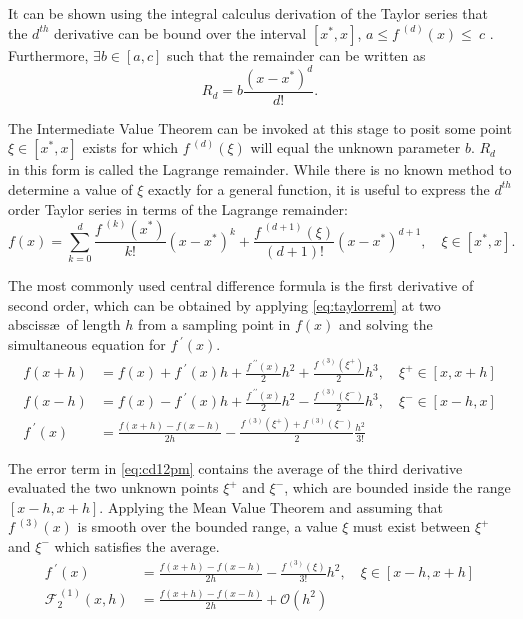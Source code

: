 It can be shown using the integral calculus derivation of the Taylor series that the $d^{th}$ derivative can be bound over the interval $[x^*, x]$, \ie $a\leq f^{\;(d)}(x) \leq~c$ \cite{Greenberg1978}.
Furthermore, $\exists b \in [a,c]$ such that the remainder can be written as
\begin{equation}
   R_d = b \frac{(x-x^*)^d}{d!}.
\end{equation}

The Intermediate Value Theorem can be invoked at this stage to posit some point $\xi \in [x^*,x]$ exists for which $f^{\;(d)}(\xi)$ will equal the unknown parameter $b$.
$R_d$ in this form is called the Lagrange remainder.
While there is no known method to determine a value of $\xi$ exactly for a general function, it is useful to express the $d^{th}$ order Taylor series in terms of the Lagrange remainder:
\begin{equation}
    f(x) = \sum_{k=0}^d \frac{f^{\;(k)}(x^*)}{k!}(x-x^*)^k + \frac{f^{\;(d+1)}(\xi)}{(d+1)!}(x-x^*)^{d+1}, \quad \xi \in [x^*,x].\label{eq:taylorrem}
\end{equation}

The most commonly used central difference formula is the first derivative of second order, which can be obtained by applying \cref{eq:taylorrem} at two absciss\ae\ of length $h$ from a sampling point in $f(x)$ and solving the simultaneous equation for $f^{\;\prime}(x)$.
\begin{align}
f(x+h) &= f(x) + f^{\;\prime}(x)h + \frac{f^{\;\prime\prime}(x)}{2}h^2 + \frac{f^{\;(3)}(\xi^+)}{2}h^3, \quad \xi^+ \in [x,x+h] \\
f(x-h) &= f(x) - f^{\;\prime}(x)h + \frac{f^{\;\prime\prime}(x)}{2}h^2 - \frac{f^{\;(3)}(\xi^-)}{2}h^3, \quad \xi^- \in [x-h,x] \\
f^{\;\prime}(x) &= \frac{f(x+h)-f(x-h)}{2h} - \frac{f^{\;(3)}(\xi^+)+f^{\;(3)}(\xi^-)}{2}\frac{h^2}{3!}\label{eq:cd12pm}
\end{align}

The error term in \cref{eq:cd12pm} contains the average of the third derivative evaluated the two unknown points $\xi^+$ and $\xi^-$, which are bounded inside the range $[x-h,x+h]$.
Applying the Mean Value Theorem and assuming that $f^{\;(3)}(x)$ is smooth over the bounded range, a value $\xi$ must exist between $\xi^+$ and $\xi^-$ which satisfies the average.
\begin{align}
f^{\;\prime}(x) &= \frac{f(x+h)-f(x-h)}{2h} - \frac{f^{\;(3)}(\xi)}{3!}h^2, \quad \xi \in [x-h,x+h]\label{eq:cd12t} \\
\mathcal{F}_2^{\,(1)}(x,h) &= \frac{f(x+h)-f(x-h)}{2h} + \mathcal{O}(h^2)\label{eq:cd12f}
\end{align}

